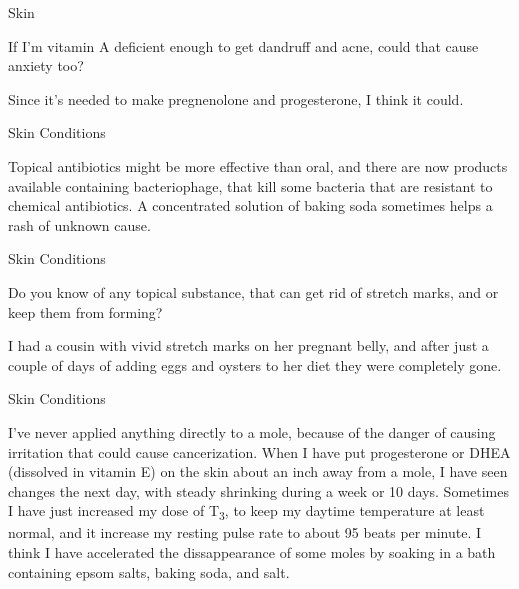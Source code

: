 \documentclass[11pt,oneside,openany,extrafontsizes]{memoir}
\begin{document}
\begin{qaexchange}{Skin}

    \begin{question}
        If I'm vitamin A deficient enough to get dandruff and acne, could that cause anxiety too?
    \end{question}

    \begin{answer}
        Since it's needed to make pregnenolone and progesterone, I think it could.
    \end{answer}
\end{qaexchange}

\begin{standalonequote}{Skin Conditions}

    \begin{answer}
      Topical antibiotics might be more effective than oral, and there are now products available containing bacteriophage, that kill some bacteria that are resistant to chemical antibiotics. A concentrated solution of baking soda sometimes helps a rash of unknown cause.
    \end{answer}
\end{standalonequote}

\begin{qaexchange}{Skin Conditions}

    \begin{question}
        Do you know of any topical substance, that can get rid of stretch marks, and or keep them from forming?
    \end{question}

    \begin{answer}
      I had a cousin with vivid stretch marks on her pregnant belly, and after just a couple of days of adding eggs and oysters to her diet they were completely gone.
    \end{answer}
\end{qaexchange}

\begin{standalonequote}{Skin Conditions}

    \begin{answer}
      I've never applied anything directly to a mole, because of the danger of causing irritation that could cause cancerization. When I have put progesterone or DHEA (dissolved in vitamin E) on the skin about an inch away from a mole, I have seen changes the next day, with steady shrinking during a week or 10 days. Sometimes I have just increased my dose of T\textsubscript{3}, to keep my daytime temperature at least normal, and it increase my resting pulse rate to about 95 beats per minute. I think I have accelerated the dissappearance of some moles by soaking in a bath containing epsom salts, baking soda, and salt.
    \end{answer}
\end{standalonequote}
\end{document}
